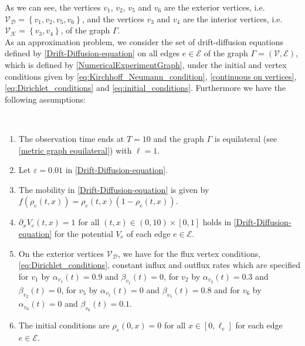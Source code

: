 As we can see, the vertices $v_1$, $v_2$, $v_5$ and $v_6$ are the exterior vertices, i.e. $\mathcal{V}_{\mathcal{D}} = \left\{v_1, v_2, v_5, v_6 \right\}$, and the vertices $v_3$ and $v_4$ are the interior vertices, i.e. $\mathcal{V}_{\mathcal{K}} = \left\{v_3, v_4 \right \}$, of the graph $\Gamma$. \\
As an approximation problem, we consider the set of drift-diffusion equations defined by \cref{Drift-Diffusion-equation} on all edges $e \in \mathcal{E}$ of the graph $\Gamma = \left(\mathcal{V}, \mathcal{E} \right)$, which is defined by \cref{NumericalExperimentGraph}, under the initial and vertex conditions given by \cref{eq:Kirchhoff_Neumann_condition}, \cref{continuous on vertices}, \cref{eq:Dirichlet_conditions} and \cref{eq:initial_conditions}. Furthermore we have the following assumptions:
\begin{assumption} \label{graph_assumptions} 
    \ \\[-1.5\baselineskip]
    \begin{enumerate}
        \item The observation time ends at $T = 10$ and the graph $\Gamma$ is equilateral (see \cref{metric graph equilateral}) with $\ell = 1$. 
        \item Let $\varepsilon = 0.01$ in \cref{Drift-Diffusion-equation}.
        \item The mobility in \cref{Drift-Diffusion-equation} is given by $f \left( \rho_e(t,x) \right) = \rho_e \left(t,x\right)\left(1-\rho_e \left(t,x\right)\right)$.
        \item $\partial_x V_e \left(t,x\right) = 1$ for all $\left(t,x\right) \in \left(0, 10\right) \times \left[0,1\right]$ holds in \cref{Drift-Diffusion-equation} for the potential $V_e$ of each edge $e \in \mathcal{E}$. 
        \item On the exterior vertices $\mathcal{V}_{\mathcal{D}}$, we have for the flux vertex conditions, \cref{eq:Dirichlet_conditions}, constant influx and outflux rates which are specified for $v_1$ by $\alpha_{v_1}\left(t\right) = 0.9$ and $\beta_{v_1}\left(t\right) = 0$, for $v_2$ by $\alpha_{v_2}\left(t\right) = 0.3$ and $\beta_{v_2}\left(t\right) = 0$, for $v_5$ by $\alpha_{v_5}\left(t\right) = 0$ and $\beta_{v_5}\left(t\right) = 0.8$ and for $v_6$ by $\alpha_{v_6}\left(t\right) = 0$ and $\beta_{v_6}\left(t\right) = 0.1$.
        \item The initial conditions are $\rho_e\left(0,x\right) = 0$ for all $x \in \left[0, \ell_e\right]$ for each edge $e \in \mathcal{E}$. 
    \end{enumerate}
\end{assumption}

